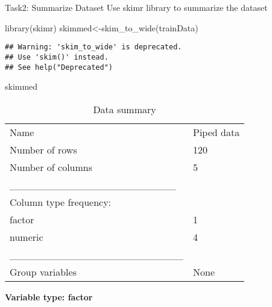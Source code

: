 \documentclass[
]{article}
\newenvironment{Shaded}{\begin{snugshade}}{\end{snugshade}}
\newcommand{\FunctionTok}[1]{\textcolor[rgb]{0.00,0.00,0.00}{#1}}
\newcommand{\NormalTok}[1]{#1}
\newcommand{\OtherTok}[1]{\textcolor[rgb]{0.56,0.35,0.01}{#1}}
\begin{document}
Task2: Summarize Dataset Use skimr library to summarize the dataset

\begin{Shaded}
\begin{Highlighting}[]
\FunctionTok{library}\NormalTok{(skimr)}
\NormalTok{skimmed}\OtherTok{\textless{}{-}}\FunctionTok{skim\_to\_wide}\NormalTok{(trainData)}
\end{Highlighting}
\end{Shaded}

\begin{verbatim}
## Warning: 'skim_to_wide' is deprecated.
## Use 'skim()' instead.
## See help("Deprecated")
\end{verbatim}

\begin{Shaded}
\begin{Highlighting}[]
\NormalTok{skimmed}
\end{Highlighting}
\end{Shaded}

\begin{longtable}[]{@{}ll@{}}
\caption{Data summary}\tabularnewline
\toprule()
\endhead
Name & Piped data \\
Number of rows & 120 \\
Number of columns & 5 \\
\_\_\_\_\_\_\_\_\_\_\_\_\_\_\_\_\_\_\_\_\_\_\_ & \\
Column type frequency: & \\
factor & 1 \\
numeric & 4 \\
\_\_\_\_\_\_\_\_\_\_\_\_\_\_\_\_\_\_\_\_\_\_\_\_ & \\
Group variables & None \\
\bottomrule()
\end{longtable}

\textbf{Variable type: factor}
\end{document}
